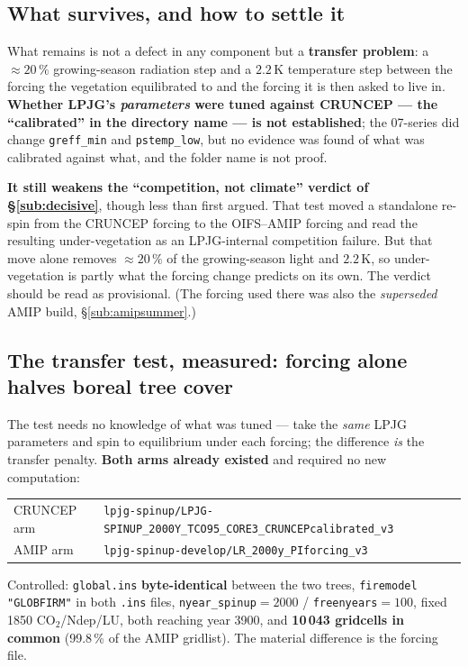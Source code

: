 \documentclass[10pt]{article}
\begin{document}
\subsection{What survives, and how to settle it}\label{sub:forcingtest}
What remains is not a defect in any component but a \textbf{transfer problem}: a $\approx20\,\%$
growing-season radiation step and a $2.2$\,K temperature step between the forcing the vegetation
equilibrated to and the forcing it is then asked to live in. \textbf{Whether LPJG's \emph{parameters} were
tuned against CRUNCEP --- the ``calibrated'' in the directory name --- is not established}; the 07-series did
change \texttt{greff\_min} and \texttt{pstemp\_low}, but no evidence was found of what was calibrated against
what, and the folder name is not proof.

\textbf{It still weakens the ``competition, not climate'' verdict of \S\ref{sub:decisive}}, though less than
first argued. That test moved a standalone re-spin from the CRUNCEP forcing to the OIFS--AMIP forcing and
read the resulting under-vegetation as an LPJG-internal competition failure. But that move alone removes
$\approx20\,\%$ of the growing-season light and $2.2$\,K, so under-vegetation is partly what the forcing
change predicts on its own. The verdict should be read as provisional. (The forcing used there was also the
\emph{superseded} AMIP build, \S\ref{sub:amipsummer}.)

\subsection{The transfer test, measured: forcing alone halves boreal tree cover}\label{sub:xfer}
The test needs no knowledge of what was tuned --- take the \emph{same} LPJG parameters and spin to
equilibrium under each forcing; the difference \emph{is} the transfer penalty. \textbf{Both arms already
existed} and required no new computation:
\begin{center}\footnotesize
\begin{tabular}{l l}
\toprule
CRUNCEP arm & \texttt{lpjg-spinup/LPJG-SPINUP\_2000Y\_TCO95\_CORE3\_CRUNCEPcalibrated\_v3} \\
AMIP arm    & \texttt{lpjg-spinup-develop/LR\_2000y\_PIforcing\_v3} \\
\bottomrule
\end{tabular}
\end{center}
Controlled: \texttt{global.ins} \textbf{byte-identical} between the two trees, \texttt{firemodel "GLOBFIRM"}
in both \texttt{.ins} files, \texttt{nyear\_spinup}$=2000$ / \texttt{freenyears}$=100$, fixed 1850
CO$_2$/Ndep/LU, both reaching year 3900, and \textbf{10\,043 gridcells in common} (99.8\,\% of the AMIP
gridlist). The material difference is the forcing file.
\end{document}
